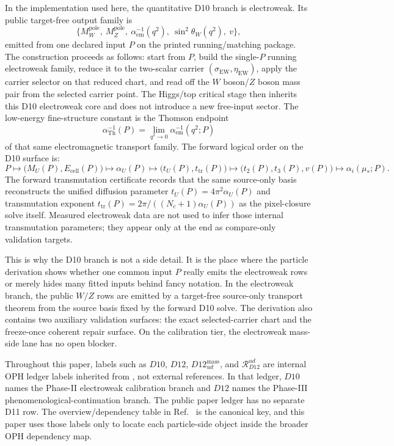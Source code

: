 \documentclass[11pt]{article}
\begin{document}
In the implementation used here, the quantitative D10 branch is electroweak. Its public
target-free output family is
\[
\{M_W^{\mathrm{pole}},\ M_Z^{\mathrm{pole}},\ \alpha_{\mathrm{em}}^{-1}(q^2),\ \sin^2\theta_W(q^2),\ v\},
\]
emitted from one declared input \(P\) on the printed running/matching package. The construction
proceeds as follows: start from \(P\), build the single-\(P\) running
electroweak family, reduce it to the two-scalar carrier \((\sigma_{\mathrm{EW}},
\eta_{\mathrm{EW}})\), apply the carrier selector on that reduced chart, and read off the
\(W\) boson/\(Z\) boson mass pair from the selected carrier point. The Higgs/top critical stage
then inherits this D10 electroweak core and does not introduce a new
free-input sector. The low-energy fine-structure constant is the Thomson endpoint
\[
\alpha_{\mathrm{Th}}^{-1}(P)=\lim_{q^2\to 0}\alpha_{\mathrm{em}}^{-1}(q^2;P)
\]
of that same electromagnetic transport family.
The forward logical order on the D10 surface is:
\[
P
\longmapsto
\bigl(M_U(P),E_{\mathrm{cell}}(P)\bigr)
\longmapsto
\alpha_U(P)
\longmapsto
\bigl(t_U(P),t_{\mathrm{tr}}(P)\bigr)
\longmapsto
\bigl(t_2(P),t_3(P),v(P)\bigr)
\longmapsto
\alpha_i(\mu_\ast;P).
\]
The forward transmutation certificate records that the same source-only basis reconstructs the unified diffusion parameter \(t_U(P)=4\pi^2\alpha_U(P)\) and transmutation exponent \(t_{\mathrm{tr}}(P)=2\pi/((N_c+1)\alpha_U(P))\) as the pixel-closure solve itself. Measured electroweak data are not used to infer those internal transmutation parameters; they appear only at the end as compare-only validation targets.

This is why the D10 branch is not a side detail. It is the place where the particle derivation
shows whether one common input \(P\) really emits the electroweak rows or merely hides many fitted
inputs behind fancy notation. In the electroweak branch, the public \(W/Z\) rows are emitted by a
target-free source-only transport theorem from the source basis fixed by the forward D10 solve. The
derivation also contains two
auxiliary validation surfaces: the exact selected-carrier chart and the freeze-once coherent repair
surface. On the calibration tier, the electroweak mass-side lane has no open blocker.

Throughout this paper, labels such as \(D10\), \(D12\), \(D12_{ud}^{\mathrm{mass}}\), and
\(\mathcal R_{D12}^{ud}\) are internal OPH ledger labels inherited from
\cite{ophcompact}, not external references. In that ledger, \(D10\) names the Phase-II
electroweak calibration branch and \(D12\) names the Phase-III phenomenological-continuation
branch. The public paper ledger has no separate D11 row. The overview/dependency table in
Ref.~\cite{ophcompact} is the canonical key, and this paper uses those labels only to locate
each particle-side object inside the broader OPH dependency map.
\end{document}
